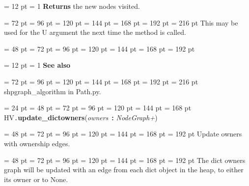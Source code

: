 {{{{{{\par \pagebreak[3.100000] \noindent \hangindent = 12 pt \hangafter = 1 
{\bf Returns \/} the new nodes visited.\par}
{\par \noindent  \leftskip = 72 pt  \leftmargini = 96 pt  \leftmarginii = 120 pt  \leftmarginiii = 144 pt  \leftmarginiv = 168 pt  \leftmarginv = 192 pt  \leftmarginvi = 216 pt  This may be used for the U argument the next time the method is called.
\par}
\par}
\par}
{\par \noindent  \leftskip = 48 pt  \leftmargini = 72 pt  \leftmarginii = 96 pt  \leftmarginiii = 120 pt  \leftmarginiv = 144 pt  \leftmarginv = 168 pt  \leftmarginvi = 192 pt {\par \noindent
{\par \pagebreak[3.100000] \noindent \hangindent = 12 pt \hangafter = 1 
{\bf See also\/}\par}
{\par \noindent  \leftskip = 72 pt  \leftmargini = 96 pt  \leftmarginii = 120 pt  \leftmarginiii = 144 pt  \leftmarginiv = 168 pt  \leftmarginv = 192 pt  \leftmarginvi = 216 pt  shpgraph{\_}algorithm in Path.py.
\par}
\par}
\par}
\par}
\par}
{\par \noindent  \leftskip = 24 pt  \leftmargini = 48 pt  \leftmarginii = 72 pt  \leftmarginiii = 96 pt  \leftmarginiv = 120 pt  \leftmarginv = 144 pt  \leftmarginvi = 168 pt HV{\tt .\/}{\bf {\large {\bf update{\_}dictowners\/}}\/}({\em owners\/}~{\bf :}  {\em NodeGraph+\/}){\par \noindent
{\par \noindent  \leftskip = 48 pt  \leftmargini = 72 pt  \leftmarginii = 96 pt  \leftmarginiii = 120 pt  \leftmarginiv = 144 pt  \leftmarginv = 168 pt  \leftmarginvi = 192 pt  Update owners with ownership edges.\par}
{\par \noindent  \leftskip = 48 pt  \leftmargini = 72 pt  \leftmarginii = 96 pt  \leftmarginiii = 120 pt  \leftmarginiv = 144 pt  \leftmarginv = 168 pt  \leftmarginvi = 192 pt  The dict owners graph will be updated with an edge from each dict
object in the heap, to either its owner or to None.
\par}
}}}

